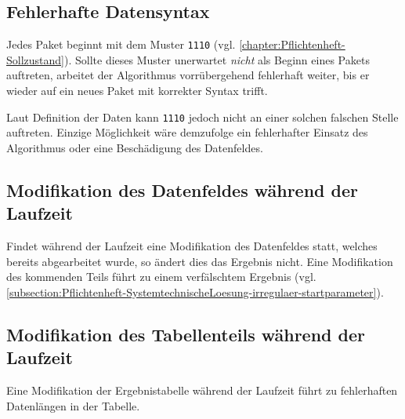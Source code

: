 \subsection{Fehlerhafte Datensyntax}
\label{subsection:Pflichtenheft-SystemtechnischeLoesung-irregulaer-syntax}

Jedes Paket beginnt mit dem Muster \texttt{1110} (vgl. \autoref{chapter:Pflichtenheft-Sollzustand}). Sollte dieses Muster unerwartet \emph{nicht} als Beginn eines Pakets auftreten, arbeitet der Algorithmus vorrübergehend fehlerhaft weiter, bis er wieder auf ein neues Paket mit korrekter Syntax trifft.

Laut Definition der Daten kann \texttt{1110} jedoch nicht an einer solchen falschen Stelle auftreten. Einzige Möglichkeit wäre demzufolge ein fehlerhafter Einsatz des Algorithmus oder eine Beschädigung des Datenfeldes.

\subsection{Modifikation des Datenfeldes während der Laufzeit}
\label{subsection:Pflichtenheft-SystemtechnischeLoesung-irregulaer-moddatenfeld}

Findet während der Laufzeit eine Modifikation des Datenfeldes statt, welches bereits abgearbeitet wurde, so ändert dies das Ergebnis nicht. Eine Modifikation des kommenden Teils führt zu einem verfälschtem Ergebnis (vgl. \autoref{subsection:Pflichtenheft-SystemtechnischeLoesung-irregulaer-startparameter}).

\subsection{Modifikation des Tabellenteils während der Laufzeit}
\label{subsection:Pflichtenheft-SystemtechnischeLoesung-irregulaer-modtabelle}

Eine Modifikation der Ergebnistabelle während der Laufzeit führt zu fehlerhaften Datenlängen in der Tabelle.
